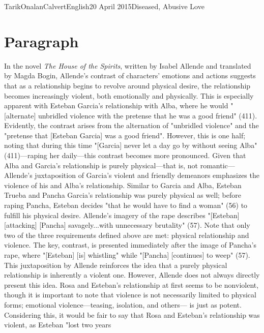 \documentclass[12pt,a4paper]{article}
\begin{document}
\begin{mla}{Tarik}{Onalan}{Calvert}{English}{20 April 2015}{Diseased, Abusive Love}
        \section{Paragraph}
            In the novel \textit{The House of the Spirits}, written by Isabel Allende
            and translated by Magda Bogin, Allende's contrast of characters' emotions
            and actions suggests that as a relationship begins to revolve around
            physical desire, the relationship becomes increasingly violent, both
            emotionally and physically. This is especially apparent with Esteban
            Garcia's relationship with Alba, where he would "[alternate] unbridled
            violence with the pretense that he was a good friend" (411). Evidently,
            the contrast arises from the alternation of "unbridled violence" and
            the "pretense that [Esteban Garcia] was a good friend". However, this
            is one half; noting that during this time "[Garcia] never let a day
            go by without seeing Alba" (411)---raping her daily---this contrast
            becomes more pronounced. Given that Alba and Garcia's relationship is
            purely physical---that is, not romantic---Allende's juxtaposition of
            Garcia's violent and friendly demeanors emphasizes the violence of his
            and Alba's relationship. Similar to Garcia and Alba, Esteban Trueba and
            Pancha Garcia's relationship was purely physical as well; before raping
            Pancha, Esteban decides "that he would have to find a woman" (56) to
            fulfill his physical desire. Allende's imagery of the rape describes
            "[Esteban] [attacking] [Pancha] savagely...with unnecessary brutality"
            (57). Note that only two of the three requirements defined above are met:
            physical relationship and violence. The key, contrast, is presented
            immediately after the image of Pancha's rape, where "[Esteban] [is]
            whistling" while "[Pancha] [continues] to weep" (57). This juxtaposition
            by Allende reinforces the idea that a purely physical relationship is
            inherently a violent one. However, Allende does not always directly present
            this idea. Rosa and Esteban's relationship at first seems to be nonviolent,
            though it is important to note that violence is not necessarily limited
            to physical forms; emotional violence---teasing, isolation, and others---
            is just as potent. Considering this, it would be fair to say that Rosa
            and Esteban's relationship was violent, as Esteban "lost two years

\end{mla}
\end{document}
